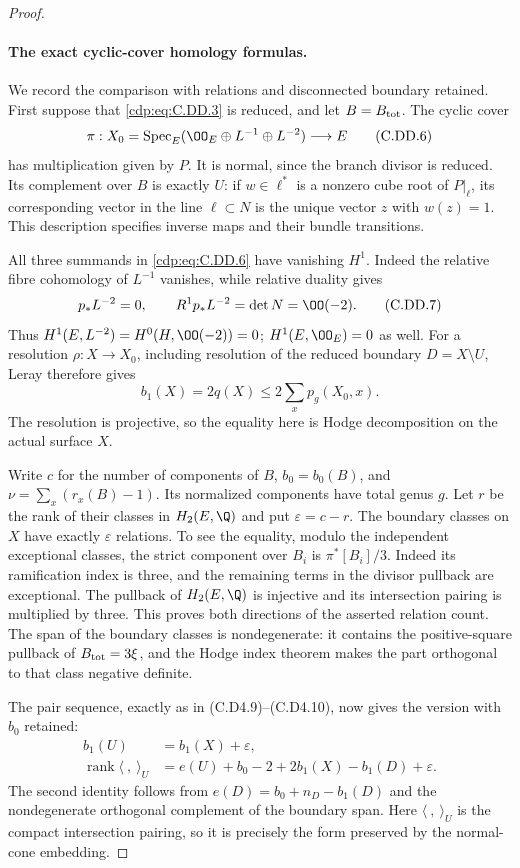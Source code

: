 \begin{proof}
\paragraph{The exact cyclic-cover homology formulas.}
We record the comparison with relations and disconnected
boundary retained. First suppose that \eqref{cdp:eq:C.DD.3} is reduced,
and let $B=B_{\rm tot}$. The cyclic cover
\[
 \pi:X_0=\operatorname{Spec}_E
       (\OO_E\oplus L^{-1}\oplus L^{-2})\longrightarrow E
\tag{C.DD.6}\label{cdp:eq:C.DD.6}
\]
has multiplication given by $P$. It is normal, since
the branch divisor is reduced. Its complement over
$B$ is exactly $U$: if $w\in\ell^*$ is a nonzero
cube root of $P|_\ell$, its corresponding vector in
the line $\ell\subset N$ is the unique vector $z$
with $w(z)=1$. This description specifies inverse
maps and their bundle transitions.

All three summands in \eqref{cdp:eq:C.DD.6} have vanishing $H^1$.
Indeed the relative fibre cohomology of $L^{-1}$
vanishes, while relative duality gives
\[
 p_*L^{-2}=0,\qquad R^1p_*L^{-2}=\det N=\OO(-2).
\tag{C.DD.7}\label{cdp:eq:C.DD.7}
\]
Thus $H^1(E,L^{-2})=H^0(H,\OO(-2))=0$;
$H^1(E,\OO_E)=0$ as well. For a resolution
$\rho:X\to X_0$, including resolution of the reduced
boundary $D=X\setminus U$, Leray therefore gives
\[
 b_1(X)=2q(X)\le2\sum_x p_g(X_0,x).
\tag{C.DD.8}\label{cdp:eq:C.DD.8}
\]
The resolution is projective, so the equality here
is Hodge decomposition on the actual surface $X$.

Write $c$ for the number of components of $B$,
$b_0=b_0(B)$, and
$\nu=\sum_x(r_x(B)-1)$. Its normalized components
have total genus $g$. Let $r$ be the rank of their
classes in $H_2(E,\Q)$ and put $\varepsilon=c-r$.
The boundary classes on $X$ have exactly
$\varepsilon$ relations. To see the equality, modulo
the independent exceptional classes, the strict
component over $B_i$ is $\pi^*[B_i]/3$.
Indeed its ramification index is three, and the
remaining terms in the divisor pullback are exceptional.
The pullback of $H_2(E,\Q)$ is injective and its
intersection pairing is multiplied by three.
This proves both directions of the asserted relation
count. The span of the boundary classes is
nondegenerate: it contains the positive-square
pullback of $B_{\rm tot}=3\xi$, and the Hodge index
theorem makes the part orthogonal to that class
negative definite.

The pair sequence, exactly as in (C.D4.9)--(C.D4.10),
now gives the version with $b_0$ retained:
\[
\begin{split}
 b_1(U)&=b_1(X)+\varepsilon,\\
 \operatorname{rank}\langle\ ,\ \rangle_U
 &=e(U)+b_0-2+2b_1(X)-b_1(D)+\varepsilon.
\end{split}
\tag{C.DD.9}\label{cdp:eq:C.DD.9}
\]
The second identity follows from
$e(D)=b_0+n_D-b_1(D)$ and the nondegenerate
orthogonal complement of the boundary span. Here
$\langle\ ,\ \rangle_U$ is the compact intersection
pairing, so it is precisely the form preserved by
the normal-cone embedding.


\end{proof}
